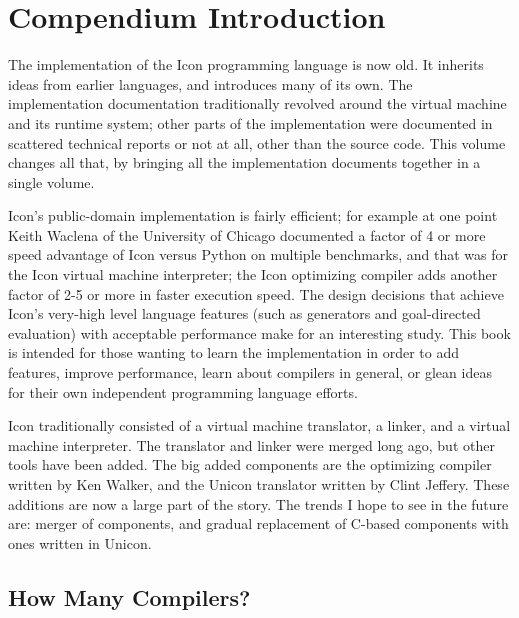\clearpage\setcounter{page}{1}\pagestyle{ClintStyleii}
\section{Compendium Introduction}

The implementation of the Icon programming language is now old. It inherits ideas from earlier languages, and introduces
many of its own. The implementation documentation traditionally revolved around the virtual machine and its runtime
system; other parts of the implementation were documented in scattered technical reports or not at all, other than the
source code. This volume changes all that, by bringing all the implementation documents together in a single volume.


Icon's public-domain implementation is fairly efficient; for example at one point Keith Waclena of the University of
Chicago documented a factor of 4 or more speed advantage of Icon versus Python on multiple benchmarks, and that was for
the Icon virtual machine interpreter; the Icon optimizing compiler adds another factor of 2-5 or more in faster
execution speed. The design decisions that achieve Icon's very-high level language features (such as generators and
goal-directed evaluation) with acceptable performance make for an interesting study. This book is intended for those
wanting to learn the implementation in order to add features, improve performance, learn about compilers in general, or
glean ideas for their own independent programming language efforts.


Icon traditionally consisted of a virtual machine translator, a linker, and a virtual machine interpreter. The
translator and linker were merged long ago, but other tools have been added. The big added components are the
optimizing compiler written by Ken Walker, and the Unicon translator written by Clint Jeffery. These additions are now
a large part of the story. The trends I hope to see in the future are: merger of components, and gradual replacement of
C-based components with ones written in Unicon.

\subsection*{How Many Compilers?}

